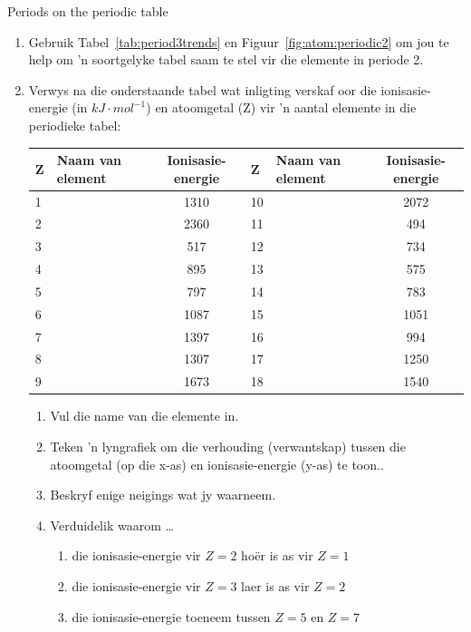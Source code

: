 \begin{exercises}{Periods on the periodic table}
{
\begin{enumerate}[noitemsep, label=\textbf{\arabic*}. ]
\item Gebruik Tabel~\ref{tab:period3trends} en Figuur~\ref{fig:atom:periodic2} om jou te help om 'n soortgelyke tabel saam te stel vir die elemente in periode 2.
\item Verwys na die onderstaande tabel wat inligting verskaf oor die ionisasie-energie (in $kJ \cdot mol^{-1}$) en atoomgetal (Z) vir 'n aantal elemente in die periodieke tabel:\\
\begin{center}
\begin{tabular}{|l|l|c|l|l|c|}\hline
\textbf{Z} & Naam van element & Ionisasie-energie & \textbf{Z} & Naam van element & Ionisasie-energie \\\hline
1 &   & 1310 & 10 &        & 2072 \\\hline
2 &     & 2360 & 11 &      & 494  \\\hline
3 &    & 517  & 12 &   & 734  \\\hline
4 &  & 895  & 13 &   & 575  \\\hline
5 &      & 797  & 14 &     & 783  \\\hline
6 &     & 1087 & 15 &  & 1051 \\\hline
7 &   & 1397 & 16 &     & 994  \\\hline
8 &     & 1307 & 17 &    & 1250 \\\hline
9 &   & 1673 & 18 &       & 1540 \\\hline
\end{tabular}
\end{center}

\begin{enumerate}[noitemsep, label=\textbf{\alph*}. ]
 \item Vul die name van die elemente in.
\item Teken 'n lyngrafiek om die verhouding (verwantskap) tussen die atoomgetal (op die x-as) en ionisasie-energie (y-as) te toon..
\item Beskryf enige neigings wat jy waarneem.
\item Verduidelik waarom \ldots
	\begin{enumerate}[noitemsep, label=\textbf{\roman*}. ]
	\item die ionisasie-energie vir $Z=2$ ho\"{e}r is as vir $Z=1$
	\item die ionisasie-energie vir $Z=3$ laer is as vir $Z=2$
	\item die ionisasie-energie toeneem tussen $Z=5$ en $Z=7$
	\end{enumerate}

\end{enumerate}
\end{enumerate}

}
\end{exercises}


